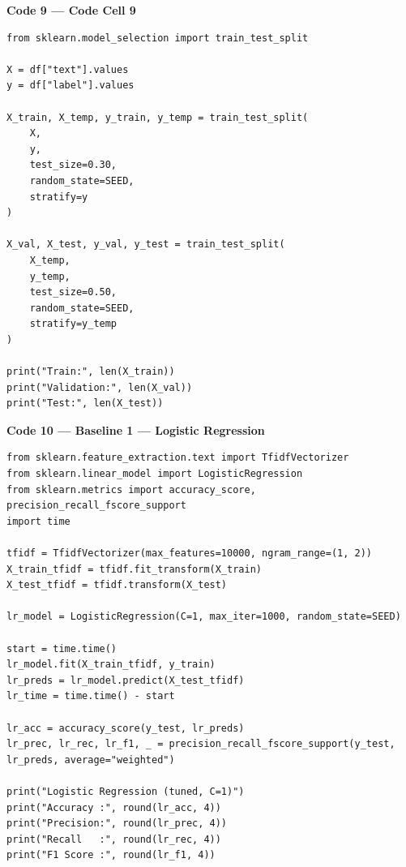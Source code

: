 \documentclass[11pt,a4paper]{article}
\begin{document}
\noindent\textbf{Code 9 --- Code Cell 9}
\begin{lstlisting}
from sklearn.model_selection import train_test_split

X = df["text"].values
y = df["label"].values

X_train, X_temp, y_train, y_temp = train_test_split(
    X,
    y,
    test_size=0.30,
    random_state=SEED,
    stratify=y
)

X_val, X_test, y_val, y_test = train_test_split(
    X_temp,
    y_temp,
    test_size=0.50,
    random_state=SEED,
    stratify=y_temp
)

print("Train:", len(X_train))
print("Validation:", len(X_val))
print("Test:", len(X_test))
\end{lstlisting}

\noindent\textbf{Code 10 --- Baseline 1 — Logistic Regression}
\begin{lstlisting}
from sklearn.feature_extraction.text import TfidfVectorizer
from sklearn.linear_model import LogisticRegression
from sklearn.metrics import accuracy_score, precision_recall_fscore_support
import time

tfidf = TfidfVectorizer(max_features=10000, ngram_range=(1, 2))
X_train_tfidf = tfidf.fit_transform(X_train)
X_test_tfidf = tfidf.transform(X_test)

lr_model = LogisticRegression(C=1, max_iter=1000, random_state=SEED)

start = time.time()
lr_model.fit(X_train_tfidf, y_train)
lr_preds = lr_model.predict(X_test_tfidf)
lr_time = time.time() - start

lr_acc = accuracy_score(y_test, lr_preds)
lr_prec, lr_rec, lr_f1, _ = precision_recall_fscore_support(y_test, lr_preds, average="weighted")

print("Logistic Regression (tuned, C=1)")
print("Accuracy :", round(lr_acc, 4))
print("Precision:", round(lr_prec, 4))
print("Recall   :", round(lr_rec, 4))
print("F1 Score :", round(lr_f1, 4))
\end{lstlisting}
\end{document}
